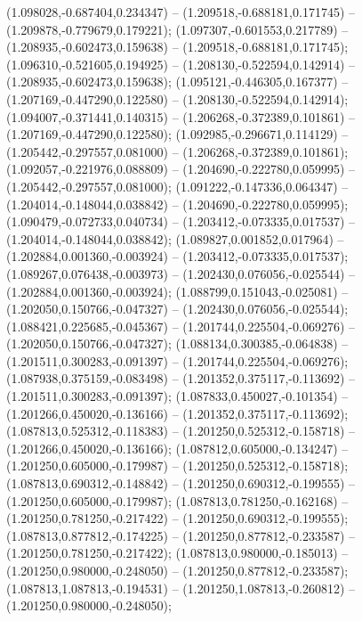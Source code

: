  (1.098028,-0.687404,0.234347) -- (1.209518,-0.688181,0.171745) -- (1.209878,-0.779679,0.179221);
 (1.097307,-0.601553,0.217789) -- (1.208935,-0.602473,0.159638) -- (1.209518,-0.688181,0.171745);
 (1.096310,-0.521605,0.194925) -- (1.208130,-0.522594,0.142914) -- (1.208935,-0.602473,0.159638);
 (1.095121,-0.446305,0.167377) -- (1.207169,-0.447290,0.122580) -- (1.208130,-0.522594,0.142914);
 (1.094007,-0.371441,0.140315) -- (1.206268,-0.372389,0.101861) -- (1.207169,-0.447290,0.122580);
 (1.092985,-0.296671,0.114129) -- (1.205442,-0.297557,0.081000) -- (1.206268,-0.372389,0.101861);
 (1.092057,-0.221976,0.088809) -- (1.204690,-0.222780,0.059995) -- (1.205442,-0.297557,0.081000);
 (1.091222,-0.147336,0.064347) -- (1.204014,-0.148044,0.038842) -- (1.204690,-0.222780,0.059995);
 (1.090479,-0.072733,0.040734) -- (1.203412,-0.073335,0.017537) -- (1.204014,-0.148044,0.038842);
 (1.089827,0.001852,0.017964) -- (1.202884,0.001360,-0.003924) -- (1.203412,-0.073335,0.017537);
 (1.089267,0.076438,-0.003973) -- (1.202430,0.076056,-0.025544) -- (1.202884,0.001360,-0.003924);
 (1.088799,0.151043,-0.025081) -- (1.202050,0.150766,-0.047327) -- (1.202430,0.076056,-0.025544);
 (1.088421,0.225685,-0.045367) -- (1.201744,0.225504,-0.069276) -- (1.202050,0.150766,-0.047327);
 (1.088134,0.300385,-0.064838) -- (1.201511,0.300283,-0.091397) -- (1.201744,0.225504,-0.069276);
 (1.087938,0.375159,-0.083498) -- (1.201352,0.375117,-0.113692) -- (1.201511,0.300283,-0.091397);
 (1.087833,0.450027,-0.101354) -- (1.201266,0.450020,-0.136166) -- (1.201352,0.375117,-0.113692);
 (1.087813,0.525312,-0.118383) -- (1.201250,0.525312,-0.158718) -- (1.201266,0.450020,-0.136166);
 (1.087812,0.605000,-0.134247) -- (1.201250,0.605000,-0.179987) -- (1.201250,0.525312,-0.158718);
 (1.087813,0.690312,-0.148842) -- (1.201250,0.690312,-0.199555) -- (1.201250,0.605000,-0.179987);
 (1.087813,0.781250,-0.162168) -- (1.201250,0.781250,-0.217422) -- (1.201250,0.690312,-0.199555);
 (1.087813,0.877812,-0.174225) -- (1.201250,0.877812,-0.233587) -- (1.201250,0.781250,-0.217422);
 (1.087813,0.980000,-0.185013) -- (1.201250,0.980000,-0.248050) -- (1.201250,0.877812,-0.233587);
 (1.087813,1.087813,-0.194531) -- (1.201250,1.087813,-0.260812) -- (1.201250,0.980000,-0.248050);

